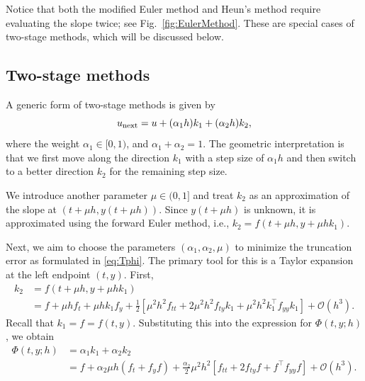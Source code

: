 \documentclass[10pt]{amsart}
\begin{document}
Notice that both the modified Euler method and Heun's method require evaluating the slope twice; see Fig.~\ref{fig:EulerMethod}. These are special cases of two-stage methods, which will be discussed below.  

\subsection{Two-stage methods}  

A generic form of two-stage methods is given by  
\begin{equation}\label{eq:twostage}  
u_{\rm next} = u + (\alpha_1 h) k_1 + (\alpha_2 h) k_2,  
\end{equation}  
where the weight $\alpha_1 \in [0,1)$, and $\alpha_1 + \alpha_2 = 1$. The geometric interpretation is that we first move along the direction $k_1$ with a step size of $\alpha_1 h$ and then switch to a better direction $k_2$ for the remaining step size.  

We introduce another parameter $\mu \in (0,1]$ and treat $k_2$ as an approximation of the slope at $(t + \mu h, y(t + \mu h))$. Since $y(t + \mu h)$ is unknown, it is approximated using the forward Euler method, i.e., $k_2 = f(t + \mu h, y + \mu h k_1)$.  

Next, we aim to choose the parameters $(\alpha_1, \alpha_2, \mu)$ to minimize the truncation error as formulated in \eqref{eq:Tphi}. The primary tool for this is a Taylor expansion at the left endpoint $(t, y)$. First,  
\begin{align*}  
k_2 &= f(t + \mu h, y + \mu h k_1) \\  
&= f + \mu h f_t + \mu h k_1 f_y + \frac{1}{2} \left[ \mu^2 h^2 f_{tt} + 2 \mu^2 h^2 f_{ty} k_1 + \mu^2 h^2 k_1^{\intercal} f_{yy} k_1 \right] + \mathcal{O}(h^3).  
\end{align*}  
Recall that $k_1 = f = f(t, y)$. Substituting this into the expression for $\Phi(t, y; h)$, we obtain  
\begin{align*}  
\Phi(t, y; h) &= \alpha_1 k_1 + \alpha_2 k_2 \\  
&= f + \alpha_2 \mu h (f_t + f_y f) + \frac{\alpha_2}{2} \mu^2 h^2 \left[ f_{tt} + 2 f_{ty} f + f^{\intercal} f_{yy} f \right] + \mathcal{O}(h^3).  
\end{align*}  
\end{document}
